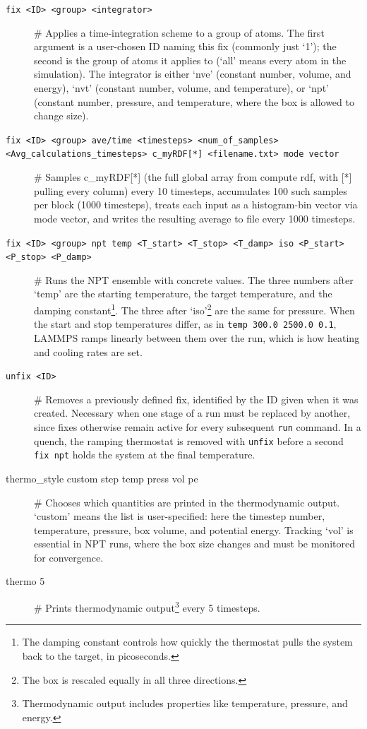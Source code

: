 \documentclass{article}
\begin{document}
\begin{description}
    \item[\texttt{fix <ID> <group> <integrator>}] \# Applies a time-integration scheme to a group of atoms. The first argument is a user-chosen ID naming this fix (commonly just `1'); the second is the group of atoms it applies to (`all' means every atom in the simulation). The integrator is either `nve' (constant number, volume, and energy), `nvt' (constant number, volume, and temperature), or `npt' (constant number, pressure, and temperature, where the box is allowed to change size).
    \item[\texttt{fix <ID> <group> ave/time <timesteps> <num\_of\_samples> <Avg\_calculations\_timesteps> c\_myRDF[*] <filename.txt> mode vector}] \# Samples c\_myRDF[*] (the full global array from compute rdf, with [*] pulling every column) every 10 timesteps, accumulates 100 such samples per block (1000 timesteps), treats each input as a histogram-bin vector via mode vector, and writes the resulting average to file every 1000 timesteps.
    \item[\texttt{fix <ID> <group> npt temp <T\_start> <T\_stop> <T\_damp> iso <P\_start> <P\_stop> <P\_damp>}] \# Runs the NPT ensemble with concrete values. The three numbers after `temp' are the starting temperature, the target temperature, and the damping constant\footnote{The damping constant controls how quickly the thermostat pulls the system back to the target, in picoseconds.}. The three after `iso'\footnote{The box is rescaled equally in all three directions.} are the same for pressure. When the start and stop temperatures differ, as in \texttt{temp 300.0 2500.0 0.1}, LAMMPS ramps linearly between them over the run, which is how heating and cooling rates are set.
    \item[\texttt{unfix <ID>}] \# Removes a previously defined fix, identified by the ID given when it was created. Necessary when one stage of a run must be replaced by another, since fixes otherwise remain active for every subsequent \texttt{run} command. In a quench, the ramping thermostat is removed with \texttt{unfix} before a second \texttt{fix npt} holds the system at the final temperature.
    \item[thermo\_style custom step temp press vol pe] \# Chooses which quantities are printed in the thermodynamic output. `custom' means the list is user-specified: here the timestep number, temperature, pressure, box volume, and potential energy. Tracking `vol' is essential in NPT runs, where the box size changes and must be monitored for convergence.
    \item[thermo 5] \# Prints thermodynamic output\footnote{Thermodynamic output includes properties like temperature, pressure, and energy.} every 5 timesteps.

\end{description}
\end{document}
